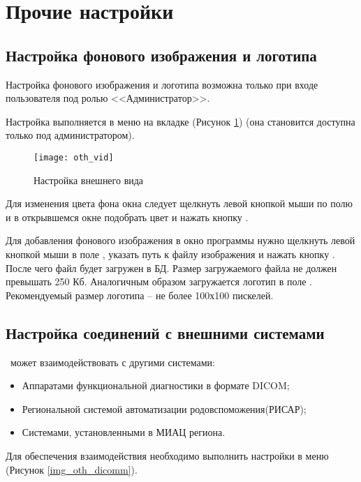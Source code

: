 \newpage
\section{Прочие настройки}

\subsection{Настройка фонового изображения и логотипа}

Настройка фонового изображения и логотипа возможна только при входе пользователя под ролью <<Администратор>>.

Настройка выполняется в меню  на вкладке  (Рисунок \ref{img_oth_vid}) (она становится доступна только под администратором).

\begin{figure}[ht]\centering
 \texttt{[image: oth\_vid]}
 \caption{Настройка внешнего вида}
 \label{img_oth_vid}
\end{figure}

Для изменения цвета фона окна следует щелкнуть левой кнопкой мыши по полю  и в открывшемся окне подобрать цвет и нажать кнопку .

Для добавления фонового изображения в окно программы нужно щелкнуть левой кнопкой мыши в поле , указать путь к файлу изображения и нажать кнопку  . После чего файл будет загружен в БД. Размер загружаемого файла не должен превышать 250 Кб. Аналогичным образом загружается логотип в поле . Рекомендуемый размер логотипа – не более 100х100 пискелей.

\subsection{Настройка соединений с внешними системами}

\tmis~может взаимодействовать с другими системами: 
\begin{itemize}
 \item Аппаратами функциональной диагностики в формате DICOM;
 \item Региональной системой автоматизации родовспоможения(РИСАР);
 \item Системами, установленными в МИАЦ региона. 
\end{itemize}

Для обеспечения взаимодействия необходимо выполнить настройки в меню  (Рисунок \ref{img_oth_dicomm}).

